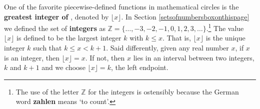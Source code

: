 \documentclass{ximera}
\begin{document}
\begin{example}
\begin{explanation}
\begin{enumerate}
\begin{image}
\end{image}
\begin{center}
\end{center}

\end{enumerate}

\end{explanation}

\end{example}



One of the favorite piecewise-defined functions in mathematical circles is the  \textbf{greatest integer of }, denoted by $\lfloor x \rfloor$. In Section \ref{setsofnumbersboxonthispage} we defined the set of \textbf{integers} as  $\mathbb{Z} = \{ \ldots, -3, -2, -1, 0, 1, 2, 3, \ldots\}$.\footnote{The use of the letter $\mathbb{Z}$ for the integers is ostensibly because the German word \textbf{zahlen} means `to count'.}  The value $\lfloor x \rfloor$  is defined to be the largest integer $k$ with $k \leq x$.  That is, $\lfloor x \rfloor$ is the unique integer $k$ such that $k \leq  x < k+1$.  Said differently, given any real number $x$, if $x$ is an integer, then  $\lfloor x \rfloor = x$.  If not, then $x$ lies in an interval between two integers, $k$ and $k+1$ and we choose  $\lfloor x \rfloor = k$, the left endpoint.
\end{document}
